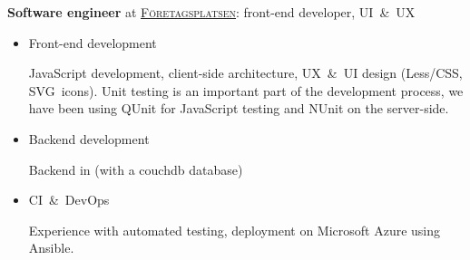 \continuedname{}
\begin{rubric}{%
}


\textbf{Software engineer} at \href{http://www.foretagsplatsen.se/}{\underline{\textsc{Företagsplatsen}}}: front-end developer, UI~\&~UX

\begin{itemize}
\item Front-end development

  JavaScript development, client-side architecture, UX~\&~UI design (Less/CSS,
  SVG~icons).  Unit testing is an important part of the development process, we
  have been using QUnit for JavaScript testing and NUnit on the server-side.

\item Backend development

Backend in \Csharp (with a couchdb database)

\item CI~\&~DevOps

Experience with automated testing, deployment on Microsoft Azure using Ansible.
\end{itemize}







\end{rubric}
